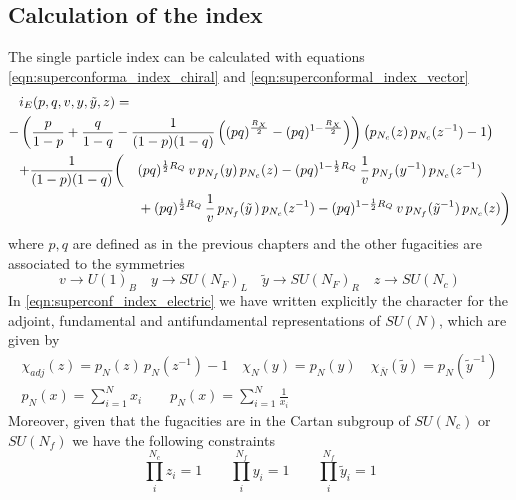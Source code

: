 \subsection{Calculation of the index}
The single particle index can be calculated with equations \eqref{eqn:superconforma_index_chiral} and \eqref{eqn:superconformal_index_vector}
\begin{equation}
\begin{aligned}
 & i_E (p,q,v, y,\tilde y ,z) = \\ 
 -& \left({p \over 1-p}+{q \over 1-q} -{1 \over (1-p)(1-q)}
\left((p q)^{\frac{R_X}{2}}- (p q)^{1-\frac{R_X}{2}}\right)
\right) \left( p_{N_c}( z)\, p_{N_c}(z^{-1})-1\right ) \\ 
&
\begin{aligned}
+&
{1\over (1-p)(1-q)}
\bigg(
&&(p q)^{{1\over 2}R_Q} \, v \, p_{N_f}(y)\, p_{N_c}(z)
- (p q)^{1- {1\over 2}R_Q} \, {1 \over v}\, p_{{N_f}}(y^{-1})\, p_{{N_c}}(z^{-1}) \\
&
 && +
(p q)^{{1\over 2}R_Q}\, {1\over v}\, p_{{N_f}}({\tilde y}\,) \, p_{{N_c}}(z^{-1})
- (p q)^{1- {1\over 2}R_Q} \, v\, p_{N_f}({\tilde y}^{-1})\, p_{N_c}(z)\bigg) \\
\end{aligned}
\end{aligned}\label{eqn:superconf_index_electric}
\end{equation}
where $ p,q$ are defined as in the previous chapters and the other fugacities are associated to the symmetries
\begin{equation}
v \rightarrow U(1)_B \quad y \rightarrow SU(N_F)_L \quad \tilde{y} \rightarrow SU(N_F)_R \quad z \rightarrow SU(N_c) 
\end{equation}
In \eqref{eqn:superconf_index_electric} we have written explicitly the character for the adjoint, fundamental and antifundamental representations of $SU(N)$, which are given by \
\begin{gather}
 \chi_{adj}(z) = p_{N}( z)\, p_{N}(z^{-1})-1 \quad \chi_{N}(y) = p_{N}(y) \quad \chi_{\overbar{N}}(\tilde{y}) = p_{N}(\tilde{y}^{-1}) \\
 p_{N}(x) = \sum_{i =1}^{N} x_i \qquad p_{N}(x) = \sum_{i =1}^{N} \frac{1}{x_i}
\end{gather}
Moreover, given that the fugacities are in the Cartan subgroup of $SU(N_c)$ or $SU(N_f)$ we have the following constraints
\begin{equation}
\prod_i^{N_c} z_i = 1 \qquad \prod_i^{N_f} y_i = 1 \qquad \prod_i^{N_f} \tilde{y}_i = 1   
\end{equation}
